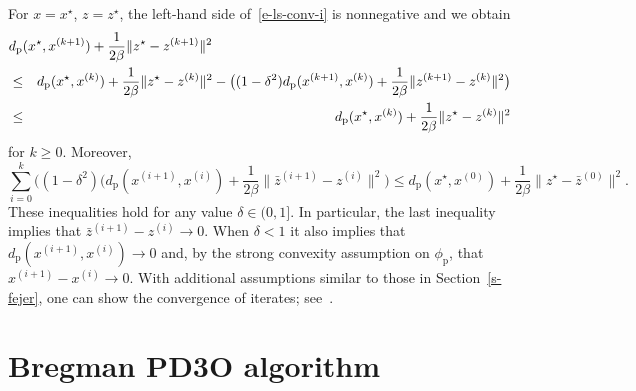 \documentclass[letterpaper,11pt]{article}
\newcommand{\BEAS}{\begin{eqnarray*}}
\newcommand{\EEAS}{\end{eqnarray*}}
\newcommand{\primal}{\mathrm p}
\begin{document}
For $x=x^\star$, $z=z^\star$, the left-hand side of~\eqref{e-ls-conv-i}
is nonnegative and we obtain
\BEAS
\lefteqn{d_\primal(x^\star,x^{(k+1)})
  +\frac{1}{2\beta}\|z^\star-z^{(k+1)}\|^2} \\
&\leq & d_\primal(x^\star,x^{(k)})+\frac{1}{2\beta}\|z^\star-z^{(k)}\|^2
  -\big((1-\delta^2)d_\primal(x^{(k+1)},x^{(k)})
  +\frac{1}{2\beta}\|z^{(k+1)}-z^{(k)}\|^2 \big) \\
&\leq & d_\primal (x^\star,x^{(k)})+\frac{1}{2\beta}\|z^\star-z^{(k)}\|^2
\EEAS
for $k \geq 0$. Moreover,
\[
\sum_{i=0}^k \Big( (1-\delta^2) (d_\primal(x^{(i+1)},x^{(i)})
  +\frac{1}{2\beta} \|\bar z^{(i+1)}-z^{(i)} \|^2 \Big) 
\leq d_\primal (x^\star, x^{(0)}) 
  +\frac{1}{2\beta} \|z^\star-\bar z^{(0)}\|^2.
\]
These inequalities hold for any value $\delta \in (0,1]$.
In particular, the last inequality implies that
$\bar z^{(i+1)}-z^{(i)} \to 0$.
When $\delta < 1$ it also implies that
$d_\primal(x^{(i+1)}, x^{(i)}) \to 0$ and,
by the strong convexity assumption on $\phi_\primal$,
that $x^{(i+1)}-x^{(i)} \to 0$.
With additional assumptions similar to those in Section~\ref{s-fejer},
one can show the convergence of iterates;
see~\cite[Section~3.3.4]{JV22}.


\section{Bregman PD3O algorithm} \label{s-bpd3o}
\end{document}
